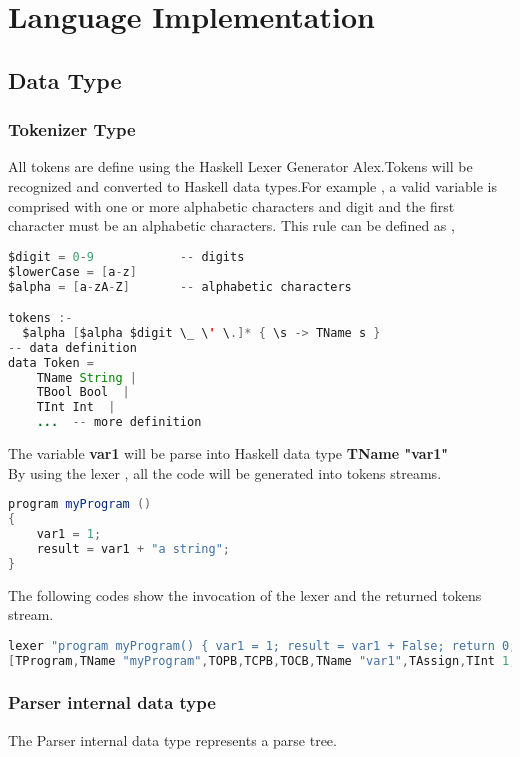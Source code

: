 \chapter{Language Implementation}


\section{Data Type}
\subsection{Tokenizer Type}
All tokens are define using the Haskell Lexer Generator Alex.Tokens will be recognized and converted to Haskell data types.For example , a valid variable is comprised with one or more alphabetic characters and digit and the first character must be an alphabetic characters. This rule can be defined as ,
\begin{lstlisting}[language=java]
$digit = 0-9			-- digits
$lowerCase = [a-z]
$alpha = [a-zA-Z]		-- alphabetic characters

tokens :-
  $alpha [$alpha $digit \_ \' \.]* { \s -> TName s }
-- data definition
data Token = 
	TName String |
	TBool Bool  | 
	TInt Int  | 
	...  -- more definition			

\end{lstlisting}

The variable \textbf{var1} will be parse into Haskell data type \textbf{TName "var1"}\\


By using the lexer , all the code will be generated into tokens streams.
\begin{lstlisting}[language=java]
program myProgram ()
{
	var1 = 1;
	result = var1 + "a string";
}
\end{lstlisting}

The following codes show the invocation of the lexer and the returned tokens stream.
\begin{lstlisting}[language=java]
lexer "program myProgram() { var1 = 1; result = var1 + False; return 0; }"
[TProgram,TName "myProgram",TOPB,TCPB,TOCB,TName "var1",TAssign,TInt 1,TSC,TName "result",TAssign,TName "var1",TPlus,TBool False,TSC,TReturn,TInt 0,TSC,TCCB]
\end{lstlisting}



\subsection{Parser internal data type}
The Parser internal data type represents a parse tree.


